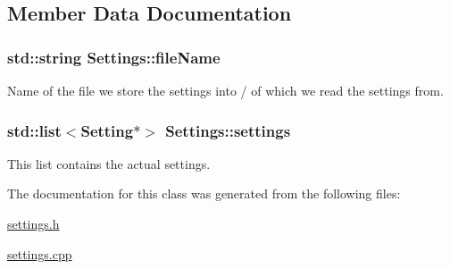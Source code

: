 \subsection{Member Data Documentation}
\hypertarget{classSettings_a73ce89f483dbf7f218871299c16d00f9}{}
\subsubsection[{file\+Name}]{\setlength{\rightskip}{0pt plus 5cm}std\+::string Settings\+::file\+Name\hspace{0.3cm}{\ttfamily [private]}}\label{classSettings_a73ce89f483dbf7f218871299c16d00f9}


Name of the file we store the settings into / of which we read the settings from. 

\hypertarget{classSettings_a6371e3d3a715453892bcf4bfb42105a8}{}
\subsubsection[{settings}]{\setlength{\rightskip}{0pt plus 5cm}std\+::list$<${\bf Setting}$\ast$$>$ Settings\+::settings\hspace{0.3cm}{\ttfamily [private]}}\label{classSettings_a6371e3d3a715453892bcf4bfb42105a8}


This list contains the actual settings. 



The documentation for this class was generated from the following files\+:\begin{DoxyCompactItemize}
\item 
\hyperlink{settings_8h}{settings.\+h}\item 
\hyperlink{settings_8cpp}{settings.\+cpp}\end{DoxyCompactItemize}
